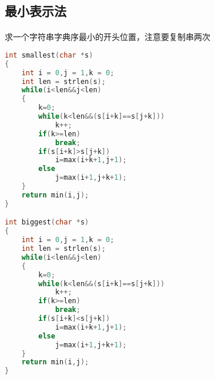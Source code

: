 ﻿\subsection{最小表示法}
\paragraph{}
求一个字符串字典序最小的开头位置，注意要复制串两次
\begin{lstlisting}[language=C++]
int smallest(char *s) 
{
    int i = 0,j = 1,k = 0;
    int len = strlen(s);
    while(i<len&&j<len)
    {
        k=0;
        while(k<len&&(s[i+k]==s[j+k]))
            k++;
        if(k>=len)
            break;
        if(s[i+k]>s[j+k])
            i=max(i+k+1,j+1);
        else
            j=max(i+1,j+k+1);
    }
    return min(i,j);
} 

int biggest(char *s) 
{
    int i = 0,j = 1,k = 0;
    int len = strlen(s);
    while(i<len&&j<len)
    {
        k=0;
        while(k<len&&(s[i+k]==s[j+k]))
            k++;
        if(k>=len)
            break;
        if(s[i+k]<s[j+k])
            i=max(i+k+1,j+1);
        else
            j=max(i+1,j+k+1);
    }
    return min(i,j);
} 

\end{lstlisting}